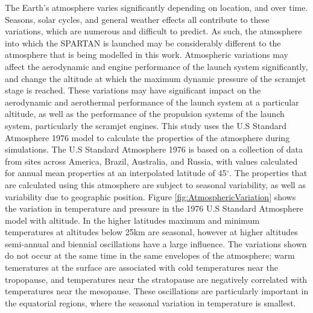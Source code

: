 The Earth's atmosphere varies significantly depending on location, and over time. Seasons, solar cycles, and general weather effects all contribute to these variations, which are numerous and difficult to predict. As such, the atmosphere into which the SPARTAN is launched may be considerably different to the atmosphere that is being modelled in this work. 
Atmospheric variations may affect the aerodynamic and engine performance of the launch system significantly, and change the altitude at which the maximum dynamic pressure of the scramjet stage is reached. These variations may have significant impact on the aerodynamic and aerothermal performance of the launch system at a particular altitude, as well as the performance of the propulsion systems of the launch system, particularly the scramjet engines. 
This study uses the U.S Standard Atmosphere 1976 model\cite{Administration1976} to calculate the properties of the atmosphere during simulations. The U.S Standard Atmosphere 1976 is based on a collection of data from sites across America, Brazil, Australia, and Russia, with values calculated for annual mean properties at an interpolated latitude of 45$^\circ$\cite{Administration1976}. The properties that are calculated using this atmosphere are subject to seasonal variability, as well as variability due to geographic position. Figure \ref{fig:AtmosphericVariation} shows the variation in temperature and pressure in the 1976 U.S Standard Atmosphere model with altitude. In the higher latitudes maximum and minimum temperatures at altitudes below 25km are seasonal, however at higher altitudes semi-annual and biennial oscillations have a large influence\cite{Administration1976}. The variations shown do not occur at the same time in the same envelopes of the atmosphere; warm temeratures at the surface are associated with cold temperatures near the tropopause, and temperatures near the stratopause are negatively correlated with temperatures near the mesopause\cite{Administration1976}. These oscillations are particularly important in the equatorial regions, where the seasonal variation in temperature is smallest. 




